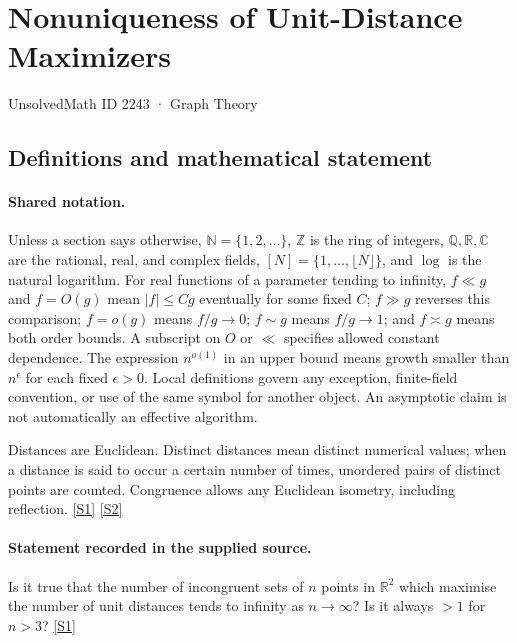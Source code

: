 \documentclass[11pt,a4paper]{article}
\newcommand{\N}{\mathbb{N}}
\newcommand{\Z}{\mathbb{Z}}
\newcommand{\Q}{\mathbb{Q}}
\newcommand{\R}{\mathbb{R}}
\newcommand{\C}{\mathbb{C}}
\newcommand{\sref}[2]{\hyperlink{source:#1:#2}{[S#2]}}
\begin{document}

\setcounter{section}{2242}

\section{Nonuniqueness of Unit-Distance Maximizers}\label{2243}

{\small\sffamily UnsolvedMath ID 2243 · Graph Theory}

\subsection{Definitions and mathematical statement}

\paragraph{Shared notation.}Unless a section says otherwise, $\N=\{1,2,\ldots\}$,
$\Z$ is the ring of integers, $\Q,\R,\C$ are the rational, real, and complex
fields, $[N]=\{1,\ldots,\lfloor N\rfloor\}$, and $\log$ is the natural
logarithm. For real functions of a parameter tending to infinity,
$f\ll g$ and $f=O(g)$ mean $|f|\leq Cg$ eventually for some fixed $C$;
$f\gg g$ reverses this comparison; $f=o(g)$ means $f/g\to0$;
$f\sim g$ means $f/g\to1$; and $f\asymp g$ means both order bounds.
A subscript on $O$ or $\ll$ specifies allowed constant dependence.
The expression $n^{o(1)}$ in an upper bound means growth smaller than
$n^\epsilon$ for each fixed $\epsilon>0$. Local definitions govern any
exception, finite-field convention, or use of the same symbol for another
object. An asymptotic claim is not automatically an effective algorithm.



Distances are Euclidean. Distinct distances mean distinct numerical values; when a distance is said to occur a certain number of times, unordered pairs of distinct points are counted. Congruence allows any Euclidean isometry, including reflection. \sref{2243}{1} \sref{2243}{2}

\paragraph{Statement recorded in the supplied source.}
Is it true that the number of incongruent sets of $n$ points in $\mathbb{R}^2$ which maximise the number of unit distances tends to infinity as $n\to\infty$? Is it always $>1$ for $n>3$? \sref{2243}{1}
\end{document}
